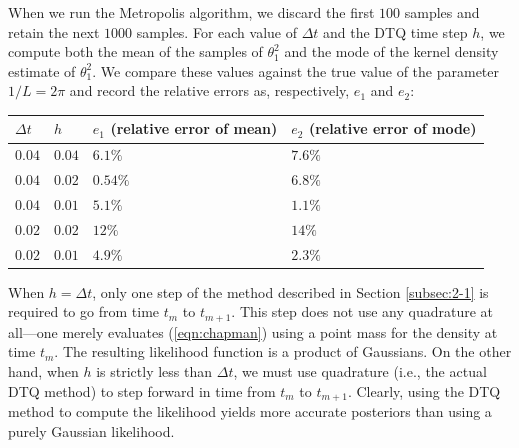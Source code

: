 \documentclass[graybox]{svmult}
\begin{document}
 When we run the Metropolis algorithm, we discard the first $100$
 samples and retain the next $1000$ samples.  For each value of
 $\Delta t$ and the DTQ time step $h$, we compute both the mean of the
 samples of $\theta_1^2$ and the mode of the kernel density estimate
 of $\theta_1^2$.  We compare these values against the true value of
 the parameter $1/L = 2 \pi$ and record the relative errors as,
 respectively, $e_1$ and $e_2$:
\begin{center}
\begin{tabular}{llll}
$\Delta t$ & $h$ & $e_1$ (relative error of mean) & $e_2$ (relative error of mode) \\ \hline
$0.04$ & $0.04$ & $6.1\%$ & $7.6\%$ \\
$0.04$ & $0.02$ & $0.54\%$ & $6.8\%$ \\
$0.04$ & $0.01$ & $5.1\%$ & $1.1\%$ \\
$0.02$ & $0.02$ & $12\%$ & $14\%$ \\
$0.02$ & $0.01$ & $4.9\%$ & $2.3\%$
\end{tabular}
\end{center}
When $h = \Delta t$, only one step of the method described in Section
\ref{subsec:2-1} is required to go from time $t_m$ to $t_{m+1}$.  This
step does not use any quadrature at all---one merely evaluates
(\ref{eqn:chapman}) using a point mass for the density at time $t_m$.
The resulting likelihood function is a product of Gaussians.  On the
other hand, when $h$ is strictly less than $\Delta t$, we must use
quadrature (i.e., the actual DTQ method) to step forward in time from
$t_m$ to $t_{m+1}$.  Clearly, using the DTQ method to compute the likelihood yields more accurate posteriors than using a purely Gaussian likelihood.
\end{document}
